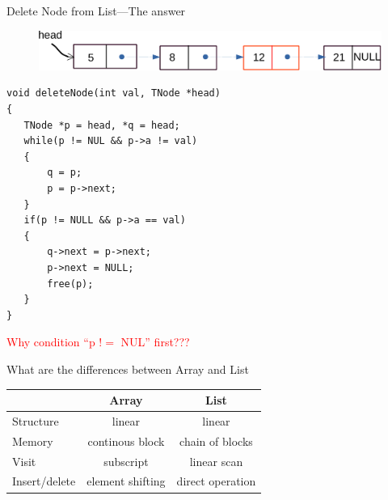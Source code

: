 \begin{frame}[fragile]{Delete Node from List---The answer}
\vspace{-0.1in}
\begin{figure}
\begin{center}
	\includegraphics[width=0.6\linewidth]{figs/list_delete_step1.pdf}
\end{center}
\end{figure}
\begin{lstlisting}[xleftmargin=0.05\linewidth, linewidth=0.9\linewidth]
void deleteNode(int val, TNode *head)
{
   TNode *p = head, *q = head;
   while(p != NUL && p->a != val)
   {
       q = p;
       p = p->next;
   }
   if(p != NULL && p->a == val)
   {
       q->next = p->next;
       p->next = NULL;
       free(p);
   }
}
\end{lstlisting}
\vspace{-0.2in}
\textcolor{red}{Why condition ``p $!=$ NUL'' first???}
\end{frame}

\begin{frame}{What are the differences between Array and List}

\begin{table}
\begin{center}
\begin{tabular}{|l|c|c|} \hline
 & Array & List \\ \hline \hline
 Structure & linear & linear \\\hline
Memory & continous block & chain of blocks\\\hline
Visit & subscript & linear scan \\ \hline
Insert/delete & element shifting & direct  operation \\\hline\hline
\end{tabular}
\end{center}
\end{table}

\end{frame}